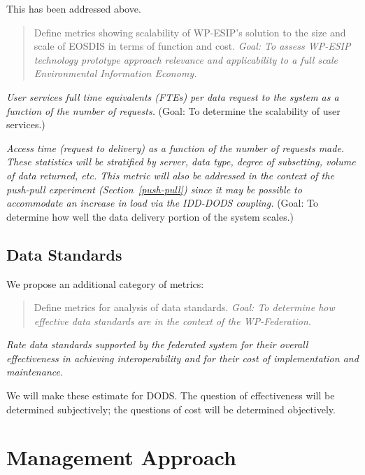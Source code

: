 \documentclass[12pt]{article}
\begin{document}
This has been addressed above.

\begin{quote}
Define metrics showing scalability of WP-ESIP's solution to the 
size and scale of EOSDIS in terms of function and cost. 
\emph{Goal: To assess WP-ESIP technology prototype approach 
relevance and applicability to a full scale Environmental Information 
Economy.}
\end{quote}
\bigskip

 \emph{User services full time equivalents (FTEs) 
per data request to the system as a function of the number of requests.}
(Goal: To determine the scalability of user services.)
\medskip

 \emph{Access time (request to delivery) as a 
function of the number of requests made. These statistics will be stratified
by server, data type, degree of subsetting, volume of data returned, etc.
This metric will also be addressed in the context of the push-pull experiment
(Section~\ref{push-pull}) since it may be possible to accommodate an
increase in load via the \ac{IDD}-\ac{DODS} coupling.} (Goal: To determine 
how well the data delivery portion of the system scales.)

\subsection{Data Standards}\label{data-standards}

We propose an additional category of metrics:

\begin{quote}
Define metrics for analysis of data standards. \emph{Goal: To determine
how effective data standards are in the context of the WP-Federation.}
\end{quote}

 \emph{Rate data standards supported by the
  federated system for their overall effectiveness 
in achieving interoperability and for their cost of 
implementation and maintenance.}

We will make these estimate for \ac{DODS}. The question of effectiveness
will be determined subjectively; the questions of cost will be 
determined objectively.

\section{Management Approach}\label{management-approach}
\end{document}
